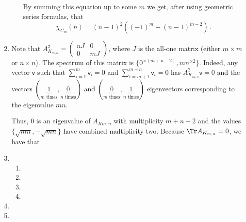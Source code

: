 \documentclass[kulak]{tplt}
\theoremstyle{definition}
\newcommand{\vv}{\mathsf{v}}
\begin{document}
\begin{enumerate}
\begin{enumerate}
By summing this equation up to some $m$ we get, after using geometric series formulas, that
$$\chi_{C_m}(n) = (n-1)^2\left( (-1)^m - (n-1)^{m-2}\right) \, . $$

\end{enumerate}


\item 
Note that $A_{K_{m, n}}^2 = \begin{pmatrix}
n J & 0 \\ 0 & mJ
\end{pmatrix}$, where $J$ is the all-one matrix (either $m\times m$ or $n\times n$).
The spectrum of this matrix is $\{ 0 ^{\times (m+n-2) }, mn^{\times 2}\}$.
Indeed, any vector $\vv $ such that $\sum_{i=1}^m \vv_i = 0$ and $\sum_{i=m+1}^{m+n} \vv_i = 0$ has $A_{K_{m, n}}^2\vv =0 $ and the vectors $(\underbrace{1}_{m \text{ times}}, \underbrace{0}_{n \text{ times}})$ and  $ (\underbrace{0}_{m \text{ times}}, \underbrace{1}_{n \text{ times}})$ eigenvectors corresponding to the eigenvalue $mn$.

Thus, $0$ is an eigenvalue of $A_{K{m, n}}$ with multiplicity $m+n-2$ and the values $\{ \sqrt{mn}, -\sqrt{mn}\}$ have combined multiplicity two.
Because $\Tr A_{K_{m, n}} =0 $,  we have that 

\item 
\begin{enumerate}
\item 

\item 

\item 

\item 

\end{enumerate}


\item 

\item 


\end{enumerate}
\end{document}
